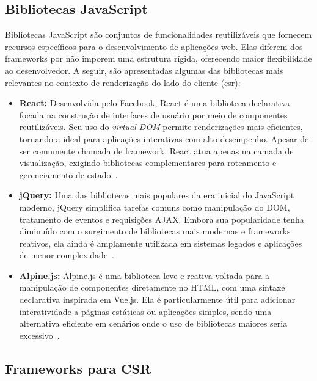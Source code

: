 \subsection{Bibliotecas JavaScript}
\label{subsec:bibliotecas-js}

Bibliotecas JavaScript são conjuntos de funcionalidades reutilizáveis que fornecem recursos específicos para o desenvolvimento de aplicações web. Elas diferem dos frameworks por não imporem uma estrutura rígida, oferecendo maior flexibilidade ao desenvolvedor. A seguir, são apresentadas algumas das bibliotecas mais relevantes no contexto de renderização do lado do cliente (\acrshort{csr}):


\begin{itemize}
  \item \textbf{React:} Desenvolvida pelo Facebook, React é uma biblioteca declarativa focada na construção de interfaces de usuário por meio de componentes reutilizáveis. Seu uso do \textit{virtual DOM} permite renderizações mais eficientes, tornando-a ideal para aplicações interativas com alto desempenho. Apesar de ser comumente chamada de framework, React atua apenas na camada de visualização, exigindo bibliotecas complementares para roteamento e gerenciamento de estado~\cite{react2025}.

  \item \textbf{jQuery:} Uma das bibliotecas mais populares da era inicial do JavaScript moderno, jQuery simplifica tarefas comuns como manipulação do DOM, tratamento de eventos e requisições AJAX. Embora sua popularidade tenha diminuído com o surgimento de bibliotecas mais modernas e frameworks reativos, ela ainda é amplamente utilizada em sistemas legados e aplicações de menor complexidade~\cite{jquery2023}.

  \item \textbf{Alpine.js:} Alpine.js é uma biblioteca leve e reativa voltada para a manipulação de componentes diretamente no HTML, com uma sintaxe declarativa inspirada em Vue.js. Ela é particularmente útil para adicionar interatividade a páginas estáticas ou aplicações simples, sendo uma alternativa eficiente em cenários onde o uso de bibliotecas maiores seria excessivo~\cite{alpinejs2023}.
\end{itemize}

\subsection{Frameworks para CSR}
\label{subsec:frameworks-csr}

